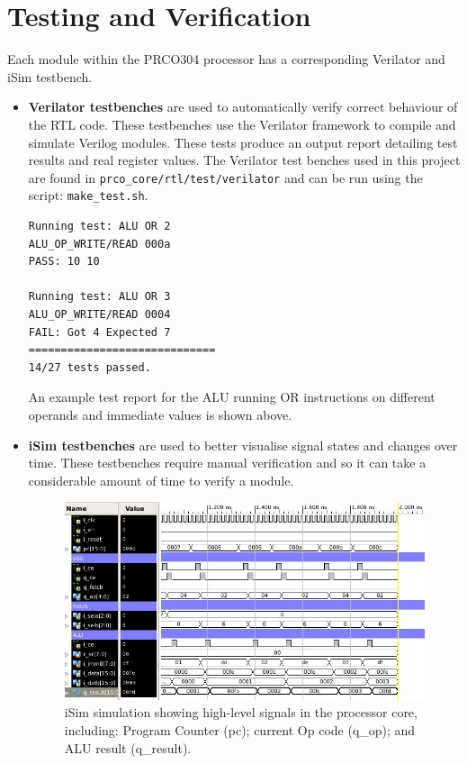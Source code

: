 \documentclass[11pt,a4paper]{report}
\newcommand{\scname}{PRCO304}
\begin{document}
\section{Testing and Verification}
\label{sect:core_test}
Each module within the \scname{} processor has a corresponding Verilator and iSim testbench.

\begin{itemize}
\item{\textbf{Verilator testbenches} are used to automatically verify correct behaviour of the RTL code. These testbenches use the Verilator framework to compile and simulate Verilog modules. These tests produce an output report detailing test results and real register values. 
The Verilator test benches used in this project are found in \verb|prco_core/rtl/test/verilator| and can be run using the script: \verb|make_test.sh|.

\begin{verbatim}
Running test: ALU OR 2
ALU_OP_WRITE/READ 000a
PASS: 10 10

Running test: ALU OR 3
ALU_OP_WRITE/READ 0004
FAIL: Got 4 Expected 7
=============================
14/27 tests passed.
\end{verbatim}
An example test report for the ALU running OR instructions on different operands and immediate values is shown above.
}

\item{\textbf{iSim testbenches} are used to better visualise signal states and changes over time. These testbenches require manual verification and so it can take a considerable amount of time to verify a module.

\begin{figure}[H]
\begin{center}
\includegraphics[scale=0.5]{core_test_isim}
\end{center}
\caption{iSim simulation showing high-level signals in the processor core, including: Program Counter (pc); current Op code (q\_op); and ALU result (q\_result).}
\label{fig:core_test_isim}
\end{figure}
}


\end{itemize}
\end{document}
